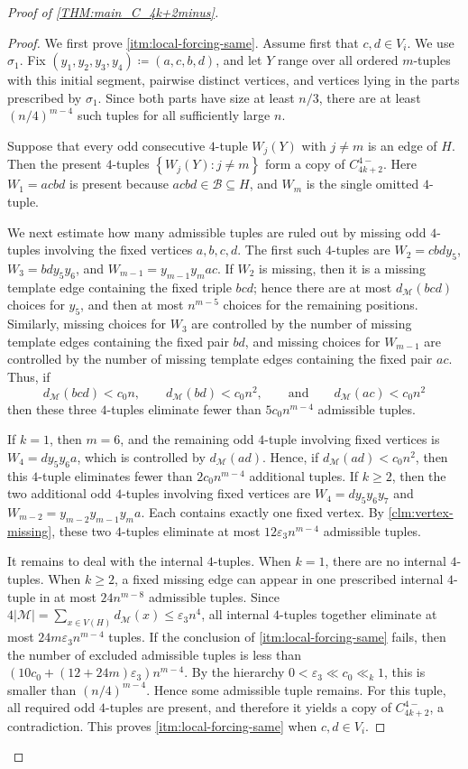 \documentclass[10pt,a4paper]{article}
\theoremstyle{plain}
\theoremstyle{definition}
\begin{document}
\begin{proof}[Proof of \cref{THM:main_C_4k+2minus}]
\begin{proof}
We first prove \cref{itm:local-forcing-same}. Assume first that $c,d\in V_i$. We use $\sigma_1$. Fix $(y_1, y_2, y_3, y_4) \coloneqq (a, c, b, d)$, and let $Y$ range over all ordered $m$-tuples with this initial segment, pairwise distinct vertices, and vertices lying in the parts prescribed by $\sigma_1$. Since both parts have size at least $n/3$, there are at least $(n/4)^{m-4}$ such tuples for all sufficiently large $n$.

Suppose that every odd consecutive $4$-tuple $W_j(Y)$ with $j\ne m$ is an edge of $H$.
Then the present $4$-tuples $\left\{W_j(Y)\colon j\ne m\right\}$ form a copy of $C_{4k+2}^{4-}$.
Here $W_1=acbd$ is present because $acbd\in\mathcal B\subseteq H$, and $W_m$ is the single omitted $4$-tuple.

We next estimate how many admissible tuples are ruled out by missing odd $4$-tuples involving the fixed vertices $a,b,c,d$.
The first such $4$-tuples are $W_2=cbdy_5$, $W_3=bdy_5y_6$, and $W_{m-1}=y_{m-1}y_mac$.
If $W_2$ is missing, then it is a missing template edge containing the fixed triple $bcd$; hence there are at most $d_{\mathcal M}(bcd)$ choices for $y_5$, and then at most $n^{m-5}$ choices for the remaining positions.
Similarly, missing choices for $W_3$ are controlled by the number of missing template edges containing the fixed pair $bd$, and missing choices for $W_{m-1}$ are controlled by the number of missing template edges containing the fixed pair $ac$.
Thus, if
\[
d_{\mathcal M}(bcd)<c_0n,
\qquad d_{\mathcal M}(bd)<c_0n^2,
\qquad\text{and}\qquad d_{\mathcal M}(ac)<c_0n^2
\]
then these three $4$-tuples eliminate fewer than $5c_0n^{m-4}$ admissible tuples.

If $k=1$, then $m=6$, and the remaining odd $4$-tuple involving fixed vertices is $W_4=dy_5y_6a$, which is controlled by $d_{\mathcal M}(ad)$. Hence, if $d_{\mathcal M}(ad)<c_0n^2$, then this $4$-tuple eliminates fewer than $2c_0n^{m-4}$ additional tuples. If $k\ge2$, then the two additional odd $4$-tuples involving fixed vertices are $W_4=dy_5y_6y_7$ and $W_{m-2}=y_{m-2}y_{m-1}y_ma$.
Each contains exactly one fixed vertex. By \cref{clm:vertex-missing}, these two $4$-tuples eliminate at most $12\varepsilon_3 n^{m-4}$ admissible tuples.

It remains to deal with the internal $4$-tuples. When $k=1$, there are no internal $4$-tuples. When $k\ge2$, a fixed missing edge can appear in one prescribed internal $4$-tuple in at most $24n^{m-8}$ admissible tuples. Since $4|\mathcal M|=\sum_{x\in V(H)}d_{\mathcal M}(x)\le \varepsilon_3 n^4$, all internal $4$-tuples together eliminate at most $24m\varepsilon_3 n^{m-4}$ tuples. If the conclusion of \cref{itm:local-forcing-same} fails, then the number of excluded admissible tuples is less than $(10c_0+(12+24m)\varepsilon_3)n^{m-4}$. 
By the hierarchy $0<\varepsilon_3\ll c_0\ll_k1$, this is smaller than $(n/4)^{m-4}$. Hence some admissible tuple remains. For this tuple, all required odd $4$-tuples are present, and therefore it yields a copy of $C_{4k+2}^{4-}$, a contradiction. This proves \cref{itm:local-forcing-same} when $c,d\in V_i$.


\end{proof}
\end{proof}
\end{document}
